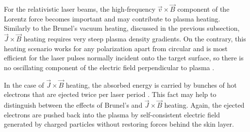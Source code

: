 For the relativistic laser beams, the high-frequency $ \vec{v} \times \vec{B} $ component of the Lorentz force becomes important and may contribute to plasma heating. Similarly to the Brunel's vacuum heating, discussed in the previous subsection, $ \vec{J} \times \vec{B} $ heating requires very steep plasma density gradients. On the contrary, this heating scenario works for any polarization apart from circular and is most efficient for the laser pulses normally incident onto the target surface, so there is no oscillating component of the electric field perpendicular to plasma \cite{Gibbon2005}.

In the case of $ \vec{J} \times \vec{B} $ heating, the absorbed energy is carried by bunches of hot electrons that are ejected twice per laser period \cite{Gibbon2005}. This fact may help to distinguish between the effects of Brunel's and $ \vec{J} \times \vec{B} $ heating. Again, the ejected electrons are pushed back into the plasma by self-consistent electric field generated by charged particles without restoring forces behind the skin layer.